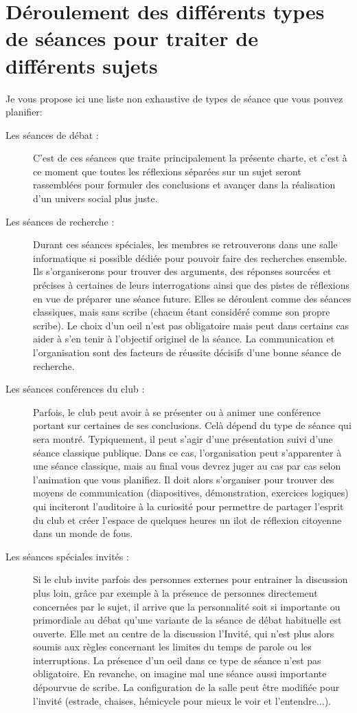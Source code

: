 \documentclass[a4paper,12pt]{article}
\begin{document}
\section{Déroulement des différents types de séances pour traiter de différents sujets}
Je vous propose ici une liste non exhaustive de types de séance que vous pouvez planifier:
\begin{description}
 \item [Les séances de débat :] C'est de ces séances que traite principalement la présente charte, et c'est à ce moment que toutes les réflexions séparées sur un sujet seront rassemblées pour formuler des conclusions et avançer dans la réalisation d'un univers social plus juste.
 \item [Les séances de recherche :] Durant ces séances spéciales, les membres se retrouverons dans une salle informatique si possible dédiée pour pouvoir faire des recherches ensemble. Ils s'organiserons pour trouver des arguments, des réponses sourcées et précises à certaines de leurs interrogations ainsi que des pistes de réflexions en vue de préparer une séance future. Elles se déroulent comme des séances classiques, mais sans scribe (chacun étant considéré comme son propre scribe). Le choix d'un oeil n'est pas obligatoire mais peut dans certains cas aider à s'en tenir à l'objectif originel de la séance. La communication et l'organisation sont des facteurs de réussite décisifs d'une bonne séance de recherche.
 \item [Les séances conférences du club :] Parfois, le club peut avoir à se présenter ou à animer une conférence portant sur certaines de ses conclusions. Celà dépend du type de séance qui sera montré. Typiquement, il peut s'agir d'une présentation suivi d'une séance classique publique. Dans ce cas, l'organisation peut s'apparenter à une séance classique, mais au final vous devrez juger au cas par cas selon l'animation que vous planifiez. Il doit alors s'organiser pour trouver des moyens de communication (diapositives, démonstration, exercices logiques) qui inciteront l'auditoire à la curiosité pour permettre de partager l'esprit du club et créer l'espace de quelques heures un ilot de réflexion citoyenne dans un monde de fous. 
 \item [Les séances spéciales invités :] Si le club invite parfois des personnes externes pour entrainer la discussion plus loin, grâce par exemple à la présence de personnes directement concernées par le sujet, il arrive que la personnalité soit si importante ou primordiale au débat qu'une variante de la séance de débat habituelle est ouverte. Elle met au centre de la discussion l'Invité, qui n'est plus alors soumis aux règles concernant les limites du temps de parole ou les interruptions. La présence d'un oeil dans ce type de séance n'est pas obligatoire. En revanche, on imagine mal une séance aussi importante dépourvue de scribe. La configuration de la salle peut être modifiée pour l'invité (estrade, chaises, hémicycle pour mieux le voir et l'entendre...).
\end{description}
\end{document}
